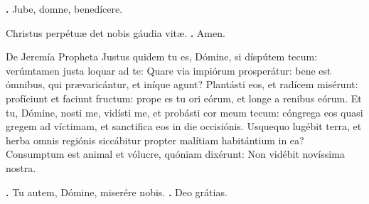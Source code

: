 \begin{small}
\textbf{\Vbar.} Jube, domne, benedícere.

Christus perpétuæ det nobis gáudia vitæ. \textbf{\Rbar.} Amen.
\end{small}


De Jeremía Propheta
Justus quidem tu es, Dómine, si díspútem tecum: verúmtamen justa loquar ad te: Quare via impiórum prosperátur: bene est ómnibus, qui prævaricántur, et iníque agunt?
Plantásti eos, et radícem misérunt: profíciunt et faciunt fructum: prope es tu ori eórum, et longe a renibus eórum.
Et tu, Dómine, nosti me, vidísti me, et probásti cor meum tecum: cóngrega eos quasi gregem ad víctimam, et sanctifica eos in die occisiónis.
Usquequo lugébit terra, et herba omnis regiónis siccábitur propter malítiam habitántium in ea? Consumptum est animal et vólucre, quóniam dixérunt: Non vidébit novíssima nostra.

\textbf{\Vbar.} Tu autem, Dómine, miserére nobis.
\textbf{\Rbar.} Deo grátias.

